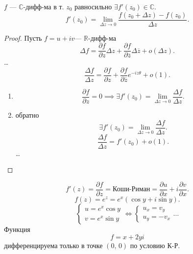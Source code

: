\begin{thm}
	$f$ --- $\mathbb{C}$-дифф-ма в т. $z_0$ равносильно
	$\exists f'(z_0)\in \mathbb{C}$. 
	\[
		f'(z_0)= \lim_{\Delta z \to 0} \frac{f(z_0+\Delta z)-f(z_0)}{\Delta z}
	.\] 
\end{thm}
\begin{proof}
	Пусть $f=u+iv$--- $\mathbb{R}$-дифф-ма
\[
	\Delta f= \frac{\partial f}{\partial z} \Delta z +\frac{\partial f}{\partial \overline{z}} \Delta \overline{z}+o(\Delta z)
.\]\ldots
\[
\frac{\Delta f}{\Delta z}= \frac{\partial f}{\partial z}+
\frac{\partial f}{\partial \overline{z}} e^{-iz\theta}+o(1)
.\] 
\begin{enumerate}
	\item \[
			\frac{\partial f}{\partial z} =0 \implies \exists f'(z_0)= \lim_{\Delta z \to 0} \frac{\Delta f}{\Delta z}
	.\] 
	\item обратно 
		\[
			\exists f'(z_0)=\lim_{\Delta z \to 0}
			\frac{\Delta f}{\Delta z}
		.\] 
		\[
			\frac{\Delta f}{\Delta z}= f'(z_0)+o(1)
		.\] 
\ldots
\end{enumerate}
\end{proof}
\[
	f'(z)= \frac{\partial f}{\partial z} =\text{Коши-Риман}=
	\frac{\partial u}{\partial x} +i \frac{\partial v}{\partial x} 
.\]
\[
	f(z)=e^{z}=e^x\left( \cos y + i \sin y  \right) 
.\] 
\[
\left\{ 
\begin{aligned}
	 u=e^x \cos y\\ v= e^x \sin y
\end{aligned}
\right. \Leftrightarrow
\left\{
	\begin{aligned}
		u_x=v_y\\ u_y= -v_x
	\end{aligned}\ldots \right.
\] 
 Функция 
\[
f = x + 2y i
\] 
дифференцируема только в точке $(0,\,0)$ по условию К-Р.

